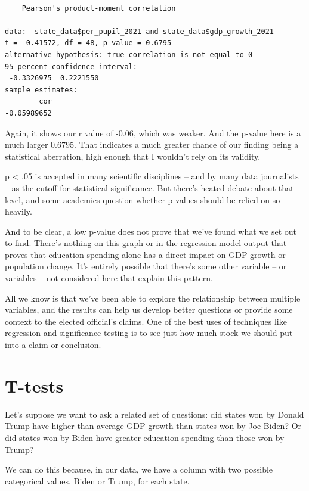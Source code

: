 \documentclass[
  letterpaper,
  DIV=11,
  numbers=noendperiod]{scrreprt}
\begin{document}
\begin{verbatim}

    Pearson's product-moment correlation

data:  state_data$per_pupil_2021 and state_data$gdp_growth_2021
t = -0.41572, df = 48, p-value = 0.6795
alternative hypothesis: true correlation is not equal to 0
95 percent confidence interval:
 -0.3326975  0.2221550
sample estimates:
        cor 
-0.05989652 
\end{verbatim}

Again, it shows our r value of -0.06, which was weaker. And the p-value
here is a much larger 0.6795. That indicates a much greater chance of
our finding being a statistical aberration, high enough that I wouldn't
rely on its validity.

p \textless{} .05 is accepted in many scientific disciplines -- and by
many data journalists -- as the cutoff for statistical significance. But
there's heated debate about that level, and some academics question
whether p-values should be relied on so heavily.

And to be clear, a low p-value does not prove that we've found what we
set out to find. There's nothing on this graph or in the regression
model output that proves that education spending alone has a direct
impact on GDP growth or population change. It's entirely possible that
there's some other variable -- or variables -- not considered here that
explain this pattern.

All we know is that we've been able to explore the relationship between
multiple variables, and the results can help us develop better questions
or provide some context to the elected official's claims. One of the
best uses of techniques like regression and significance testing is to
see just how much stock we should put into a claim or conclusion.


\hypertarget{t-tests}{%
\chapter{T-tests}\label{t-tests}}

Let's suppose we want to ask a related set of questions: did states won
by Donald Trump have higher than average GDP growth than states won by
Joe Biden? Or did states won by Biden have greater education spending
than those won by Trump?

We can do this because, in our data, we have a column with two possible
categorical values, Biden or Trump, for each state.
\end{document}

